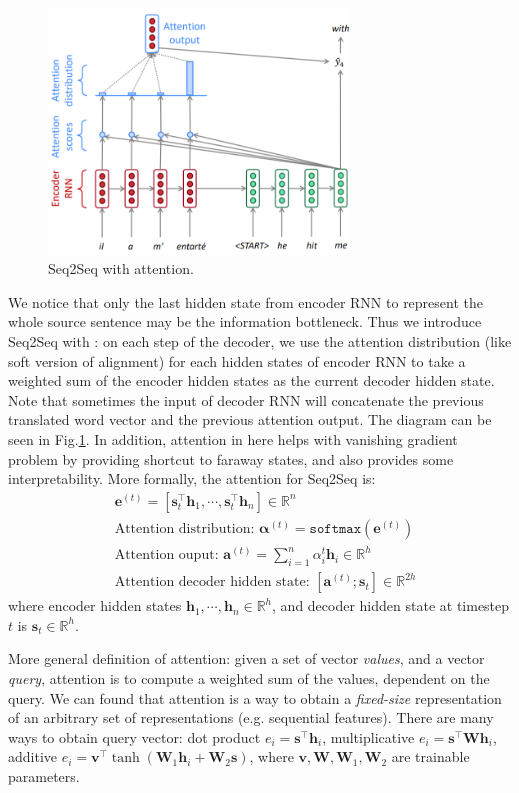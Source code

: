 \begin{figure}[!thp]
	\centerline{\includegraphics[width=8.0cm]{figs/Seq2Seq_attention.png}}
	\caption{Seq2Seq with attention.}
	\label{fig:Seq2Seq_Attention}
\end{figure}

We notice that only the last hidden state from encoder RNN to represent the whole source sentence may be the information bottleneck.
Thus we introduce Seq2Seq with : on each step of the decoder, we use the attention distribution (like soft version of alignment) for each hidden states of encoder RNN to take a weighted sum of the encoder hidden states as the current decoder hidden state.
Note that sometimes the input of decoder RNN will concatenate the previous translated word vector and the previous attention output.
The diagram can be seen in Fig.\ref{fig:Seq2Seq_Attention}.
In addition, attention in here helps with vanishing gradient problem by providing shortcut to faraway states, and also provides some interpretability.
More formally, the attention for Seq2Seq is:
\begin{align}
&\bm{e}^{(t)} = [\bm{s}_t^\top \bm{h}_1, \cdots, \bm{s}_t^\top \bm{h}_n] \in \mathbb{R}^n \nonumber \\
&\text{Attention distribution: } \bm{\alpha}^{(t)} = \texttt{softmax}(\bm{e}^{(t)}) \nonumber \\
&\text{Attention ouput: } \bm{a}^{(t)} = \sum_{i=1}^n \alpha_i^t \bm{h}_i \in \mathbb{R}^h \nonumber \\
&\text{Attention decoder hidden state: } [\bm{a}^{(t)}; \bm{s}_t] \in \mathbb{R}^{2h}
\end{align}
where encoder hidden states $\bm{h}_1, \cdots, \bm{h}_n \in \mathbb{R}^h$, and decoder hidden state at timestep $t$ is $\bm{s}_t \in \mathbb{R}^h$.

More general definition of attention: given a set of vector \emph{values}, and a vector \emph{query}, attention is to compute a weighted sum of the values, dependent on the query.
We can found that attention is a way to obtain a \emph{fixed-size} representation of an arbitrary set of representations (e.g. sequential features).
There are many ways to obtain query vector: dot product $e_i = \bm{s}^\top \bm{h}_i$, multiplicative $e_i = \bm{s}^\top \bm{W} \bm{h}_i$, additive $e_i = \bm{v}^\top \tanh (\bm{W}_1 \bm{h}_i + \bm{W}_2 \bm{s})$, where $\bm{v}, \bm{W}, \bm{W}_1, \bm{W}_2$ are trainable parameters.

